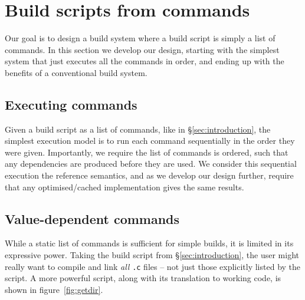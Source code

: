 \section{Build scripts from commands}
\label{sec:design}

Our goal is to design a build system where a build script is simply a list of commands. In this section we develop our design, starting with the simplest system that just executes all the commands in order, and ending up with the benefits of a conventional build system.

\subsection{Executing commands}
\label{sec:executing_commands}

Given a build script as a list of commands, like in \S\ref{sec:introduction}, the simplest execution model is to run each command sequentially in the order they were given. Importantly, we require the list of commands is ordered, such that any dependencies are produced before they are used. We consider this sequential execution the reference semantics, and as we develop our design further, require that any optimised/cached implementation gives the same results.

\subsection{Value-dependent commands}
\label{sec:monadic}

While a static list of commands is sufficient for simple builds, it is
limited in its expressive power. Taking the build script from
\S\ref{sec:introduction}, the user might really want to compile and
link \emph{all} \texttt{.c} files -- not just those explicitly listed
by the script. A more powerful script, along with its translation to
working \Rattle code, is shown in figure~\ref{fig:getdir}.



